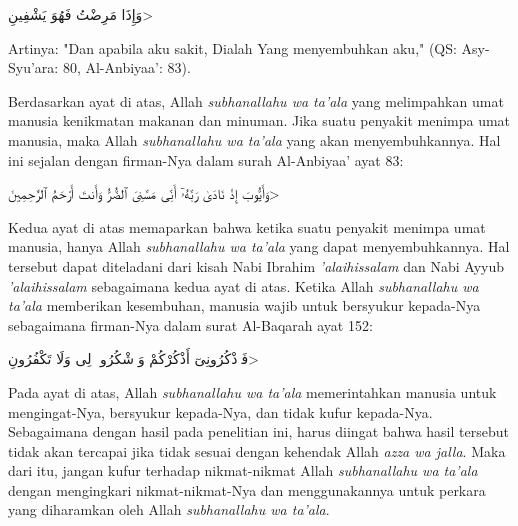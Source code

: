 \begin{flushright}
    \<وَإِذَا مَرِضْتُ فَهُوَ يَشْفِينِ>
\end{flushright}

Artinya: "Dan apabila aku sakit, Dialah Yang menyembuhkan aku," (QS: Asy-Syu'ara: 80, Al-Anbiyaa': 83).

Berdasarkan ayat di atas, Allah \textit{subhanallahu wa ta'ala} yang melimpahkan umat manusia kenikmatan makanan dan minuman. Jika suatu penyakit menimpa umat manusia, maka Allah \textit{subhanallahu wa ta'ala} yang akan menyembuhkannya. Hal ini sejalan dengan firman-Nya dalam surah Al-Anbiyaa' ayat 83:

\begin{flushright}
    \<وَأَيُّوبَ إِذْ نَادَىٰ رَبَّهُۥٓ أَنِّى مَسَّنِىَ ٱلضُّرُّ وَأَنتَ أَرْحَمُ ٱلرَّٰحِمِينَ>
\end{flushright}

Kedua ayat di atas memaparkan bahwa ketika suatu penyakit menimpa umat manusia, hanya Allah \textit{subhanallahu wa ta'ala} yang dapat menyembuhkannya. Hal tersebut dapat diteladani dari kisah Nabi Ibrahim \textit{'alaihissalam} dan Nabi Ayyub \textit{'alaihissalam} sebagaimana kedua ayat di atas. Ketika Allah \textit{subhanallahu wa ta'ala} memberikan kesembuhan, manusia wajib untuk bersyukur kepada-Nya sebagaimana firman-Nya dalam surat Al-Baqarah ayat 152:

\begin{flushright}
    \<فَٱذْكُرُونِىٓ أَذْكُرْكُمْ وَٱشْكُرُوا۟ لِى وَلَا تَكْفُرُونِ>
\end{flushright}

Pada ayat di atas, Allah \textit{subhanallahu wa ta'ala} memerintahkan manusia untuk mengingat-Nya, bersyukur kepada-Nya, dan tidak kufur kepada-Nya. Sebagaimana dengan hasil pada penelitian ini, harus diingat bahwa hasil tersebut tidak akan tercapai jika tidak sesuai dengan kehendak Allah \textit{azza wa jalla}. Maka dari itu, jangan kufur terhadap nikmat-nikmat Allah \textit{subhanallahu wa ta'ala} dengan mengingkari nikmat-nikmat-Nya dan menggunakannya untuk perkara yang diharamkan oleh Allah \textit{subhanallahu wa ta'ala}.


